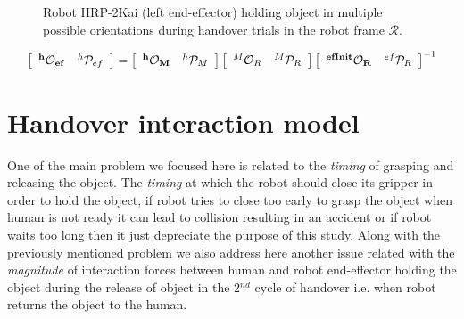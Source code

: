 \documentclass[a4paper, 12pt, oneside]{Thesis}  %
\begin{document}
\begin{figure}[ht]
	\caption{Robot HRP-2Kai (left end-effector) holding object in multiple possible orientations during handover trials in the robot frame $\mathcal{R}$.}
	\label{fig:robot_lt_orientations}
\end{figure} 


\begin{gather}\label{X_efinit_hori}
\left[\begin{array}{cc}
\bf{{}^{h}\mathcal{O}_{ef}} & {}^{h}\mathcal{P}_{ef}
\end{array}\right] =
\left[\begin{array}{cc}
\bf{{}^{h}\mathcal{O}_M} & {}^{h}\mathcal{P}_M
\end{array}\right]
\left[\begin{array}{cc}
{}^{M}\mathcal{O}_R & {}^{M}\mathcal{P}_R
\end{array}\right]
\left[\begin{array}{cc}
\bf{{}^{efInit}\mathcal{O}_{R}} & {}^{ef}\mathcal{P}_{R}
\end{array}\right]^{-1}
\end{gather}



\clearpage

\section{Handover interaction model}\label{interaction model}

One of the main problem we focused here is related to the \textit{timing} of grasping and releasing the object. The \textit{timing} at which the robot should close its gripper in order to hold the object, if robot tries to close too early to grasp the object when human is not ready it can lead to collision resulting in an accident or if robot waits too long then it just depreciate the purpose of this study. Along with the previously mentioned problem we also address here another issue related with the \textit{magnitude} of interaction forces between human and robot end-effector holding the object during the release of object in the 2$^{nd}$ cycle of handover i.e. when robot returns the object to the human.
\end{document}
